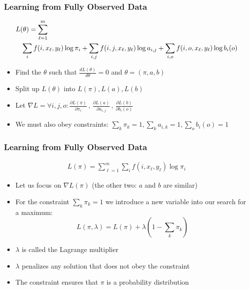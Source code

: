 \begin{frame}
\frametitle{Learning from Fully Observed Data}
{\small\begin{eqnarray*}
\lefteqn{L(\theta) = \sum_{\ell=1}^m  } \\
&& \sum_i f(i,x_\ell,y_\ell) \log \pi_i + \sum_{i,j} f(i,j,x_\ell,y_\ell) \log a_{i,j} + \sum_{i,o} f(i,o,x_\ell,y_\ell) \log b_i(o) \end{eqnarray*}}
\begin{itemize}[<+->]
\item Find the $\theta$ such that $\frac{d L(\theta)}{d \theta} = 0$ and $\theta = \left( \pi, a, b \right)$
\item Split up $L(\theta)$ into $L(\pi), L(a), L(b)$
\item Let $\nabla L = \forall i,j,o: \frac{\partial L(\pi)}{\partial \pi_i} \, , \, \frac{\partial L(a)}{\partial a_{i,j}} \, , \, \frac{\partial L(b)}{\partial b_i(o)}$
\item We must also obey constraints: $\sum_k \pi_k = 1, \sum_k a_{i,k} = 1, \sum_o b_i(o) = 1$
\end{itemize}
\end{frame}

\begin{frame}
\frametitle{Learning from Fully Observed Data}
{\small\begin{eqnarray*} L(\pi) = \sum_{\ell=1}^m \sum_i f(i,x_\ell,y_\ell) \log \pi_i \end{eqnarray*}}
\begin{itemize}[<+->]
\item Let us focus on $\nabla L(\pi)$ (the other two: $a$ and $b$ are similar)
\item For the constraint $\sum_k \pi_k = 1$ we introduce a new variable into our search for a maximum:
\[ L(\pi, \lambda) = L(\pi) + \lambda ( 1 - \sum_k \pi_k ) \]
\item $\lambda$ is called the Lagrange multiplier
\item $\lambda$ penalizes any solution that does not obey the constraint
\item The constraint ensures that $\pi$ is a probability distribution
\end{itemize}
\end{frame}

